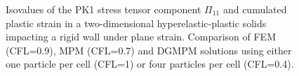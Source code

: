 \begin{figure}[ht]
  \centering
  \qquad
  \caption{Isovalues of the PK1 stress tensor component $\Pi_{11}$ and cumulated plastic strain in a two-dimensional hyperelastic-plastic solids impacting a rigid wall under plane strain. Comparison of FEM (CFL=0.9), MPM (CFL=0.7) and DGMPM solutions using either one particle per cell (CFL=1) or four particles per cell (CFL=0.4).}
  \label{fig:PS_taylor_NL}
\end{figure}

%   

%   


%   

%   

%   


